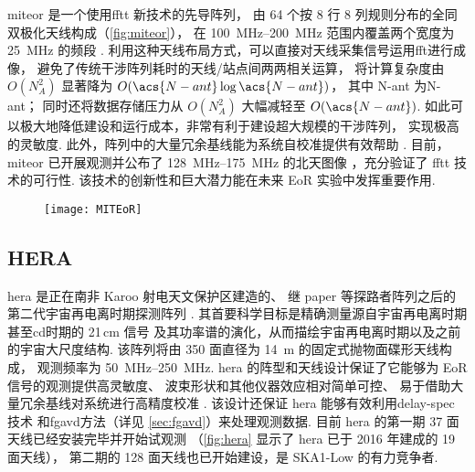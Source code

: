 \acf{miteor} 是一个使用\ac{fftt} 新技术\cite{tegmark2009,tegmark2010}的先导阵列，
由 64 个按 8 行 8 列规则分布的全同双极化天线构成（\autoref{fig:miteor}），
在 \SIrange{100}{200}{\MHz} 范围内覆盖两个宽度为 \SI{25}{\MHz} 的频段
\cite{zheng2014}.
利用这种天线布局方式，可以直接对天线采集信号运用\ac{fft}进行成像，
避免了传统干涉阵列耗时的天线/站点间两两相关运算，
将计算复杂度由 $O(N_{\!A}^2)$ 显著降为 $O(\acs{N-ant} \log\acs{N-ant})$，
其中 \acs{N-ant} 为\acl{N-ant}；
同时还将数据存储压力从 $O(N_{\!A}^2)$ 大幅减轻至 $O(\acs{N-ant})$.
如此可以极大地降低建设和运行成本，非常有利于建设超大规模的干涉阵列，
实现极高的灵敏度.
此外，阵列中的大量冗余基线能为系统自校准提供有效帮助 \cite{dillon2016}.
目前，\ac{miteor} 已开展观测并公布了 \SIrange{128}{175}{\MHz} 的北天图像
\cite{zheng2017}，充分验证了 \ac{fftt} 技术的可行性.
该技术的创新性和巨大潜力能在未来 EoR 实验中发挥重要作用.

\begin{figure}[htp]
  \centering
  \texttt{[image: MITEoR]}
  \label{fig:miteor}
\end{figure}

\subsection{HERA}

\acf{hera} 是正在南非 Karoo 射电天文保护区建造的、
继 \ac{paper} 等探路者阵列之后的第二代宇宙再电离时期探测阵列 \cite{deboer2017}.
其首要科学目标是精确测量源自宇宙再电离时期甚至\ac{cd}时期的 21\,cm 信号
及其功率谱的演化，从而描绘宇宙再电离时期以及之前的宇宙大尺度结构.
该阵列将由 350 面直径为 \SI{14}{\meter} 的固定式抛物面碟形天线构成，
观测频率为 \SIrange{50}{250}{\MHz}.
\acs{hera} 的阵型和天线设计保证了它能够为 EoR 信号的观测提供高灵敏度、
波束形状和其他仪器效应相对简单可控、
易于借助大量冗余基线对系统进行高精度校准 \cite{dillon2016}.
该设计还保证 \acs{hera} 能够有效利用\ac{delay-spec} 技术\cite{parsons2012}
和\ac{fgavd}方法（详见 \autoref{sec:fgavd}）来处理观测数据.
目前 \acs{hera} 的第一期 37 面天线已经安装完毕并开始试观测
（\autoref{fig:hera} 显示了 \acs{hera} 已于 2016 年建成的 19 面天线），
第二期的 128 面天线也已开始建设，是 SKA1-Low 的有力竞争者.

